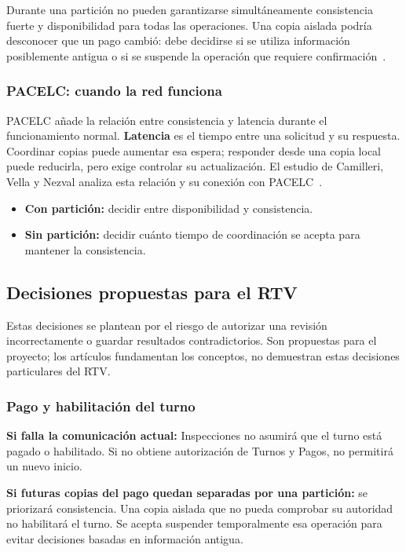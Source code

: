 \documentclass[11pt,a4paper]{article}
\begin{document}
	Durante una partición no pueden garantizarse simultáneamente consistencia fuerte y disponibilidad para todas las operaciones. Una copia aislada podría desconocer que un pago cambió: debe decidirse si se utiliza información posiblemente antigua o si se suspende la operación que requiere confirmación~\cite{camilleri_horizontally_2024,calatrava_holistic_2022}.
	
	\subsubsection{PACELC: cuando la red funciona}
	
	PACELC añade la relación entre consistencia y latencia durante el funcionamiento normal. \textbf{Latencia} es el tiempo entre una solicitud y su respuesta. Coordinar copias puede aumentar esa espera; responder desde una copia local puede reducirla, pero exige controlar su actualización. El estudio de Camilleri, Vella y Nezval analiza esta relación y su conexión con PACELC~\cite{camilleri_horizontally_2024}.
	
	\begin{itemize}[nosep]
		\item \textbf{Con partición:} decidir entre disponibilidad y consistencia.
		\item \textbf{Sin partición:} decidir cuánto tiempo de coordinación se acepta para mantener la consistencia.
	\end{itemize}
	
	\subsection{Decisiones propuestas para el RTV}
	
	Estas decisiones se plantean por el riesgo de autorizar una revisión incorrectamente o guardar resultados contradictorios. Son propuestas para el proyecto; los artículos fundamentan los conceptos, no demuestran estas decisiones particulares del RTV.
	
	\subsubsection{Pago y habilitación del turno}
	
	\textbf{Si falla la comunicación actual:} Inspecciones no asumirá que el turno está pagado o habilitado. Si no obtiene autorización de Turnos y Pagos, no permitirá un nuevo inicio.
	
	\textbf{Si futuras copias del pago quedan separadas por una partición:} se priorizará consistencia. Una copia aislada que no pueda comprobar su autoridad no habilitará el turno. Se acepta suspender temporalmente esa operación para evitar decisiones basadas en información antigua.
	
\end{document}
